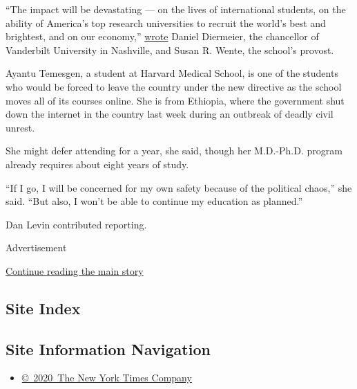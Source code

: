 ``The impact will be devastating --- on the lives of international
students, on the ability of America's top research universities to
recruit the world's best and brightest, and on our economy,''
\href{https://news.vanderbilt.edu/2020/07/07/vanderbilt-statement-on-ice-guidance-regarding-international-students-and-online-course-this-fall/}{wrote}
Daniel Diermeier, the chancellor of Vanderbilt University in Nashville,
and Susan R. Wente, the school's provost.

Ayantu Temesgen, a student at Harvard Medical School, is one of the
students who would be forced to leave the country under the new
directive as the school moves all of its courses online. She is from
Ethiopia, where the government shut down the internet in the country
last week during an outbreak of deadly civil unrest.

She might defer attending for a year, she said, though her M.D.-Ph.D.
program already requires about eight years of study.

``If I go, I will be concerned for my own safety because of the
political chaos,'' she said. ``But also, I won't be able to continue my
education as planned.''

Dan Levin contributed reporting.

Advertisement

\protect\hyperlink{after-bottom}{Continue reading the main story}

\hypertarget{site-index}{%
\subsection{Site Index}\label{site-index}}

\hypertarget{site-information-navigation}{%
\subsection{Site Information
Navigation}\label{site-information-navigation}}

\begin{itemize}
\tightlist
\item
  \href{https://help.nytimes.com/hc/en-us/articles/115014792127-Copyright-notice}{©~2020~The
  New York Times Company}
\end{itemize}

